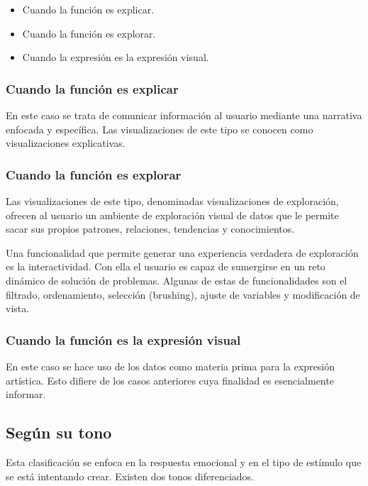 \begin{itemize}
  \item Cuando la función es explicar.
  \item Cuando la función es explorar.
  \item Cuando la expresión es la expresión visual.
\end{itemize}

\subsubsection{Cuando la función es explicar}

En este caso se trata de comunicar información al usuario mediante una narrativa enfocada y específica. Las visualizaciones de este tipo se conocen como visualizaciones explicativas.

\subsubsection{Cuando la función es explorar}

Las visualizaciones de este tipo, denominadas visualizaciones de exploración, ofrecen al usuario un ambiente de exploración visual de datos que le permite sacar sus propios patrones, relaciones, tendencias y conocimientos.

Una funcionalidad que permite generar una experiencia verdadera de exploración es la interactividad. Con ella el usuario es capaz de sumergirse en un reto dinámico de solución de problemas. Algunas de estas de funcionalidades son el filtrado, ordenamiento, selección (brushing), ajuste de variables y modificación de vista.

\subsubsection{Cuando la función es la expresión visual}

En este caso se hace uso de los datos como materia prima para la expresión artística. Esto difiere de los casos anteriores cuya finalidad es esencialmente informar.

\subsection{Según su tono}

Esta clasificación se enfoca en la respuesta emocional y en el tipo de estímulo que se está intentando crear. Existen dos tonos diferenciados.

